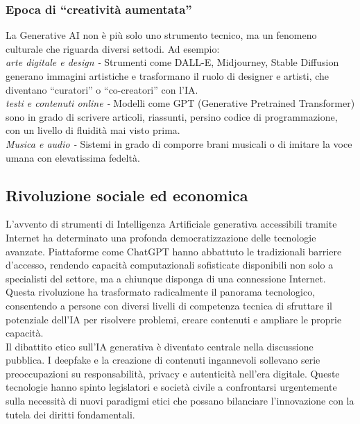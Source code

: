 \documentclass[14pt]{extbook}
\begin{document}
\subsubsection{Epoca di “creatività aumentata”}
La Generative AI non è più solo uno strumento tecnico, ma un fenomeno culturale che riguarda diversi settodi. Ad esempio:\\

\textit{arte digitale e design -} Strumenti come DALL-E, Midjourney, Stable Diffusion generano immagini artistiche e trasformano il ruolo di designer e artisti, che diventano “curatori” o “co-creatori” con l’IA.\\

\textit{testi e contenuti online -} Modelli come GPT (Generative Pretrained Transformer) sono in grado di scrivere articoli, riassunti, persino codice di programmazione, con un livello di fluidità mai visto prima.\\

\textit{Musica e audio -} Sistemi in grado di comporre brani musicali o di imitare la voce umana con elevatissima fedeltà.\\

\subsection{Rivoluzione sociale ed economica}
L'avvento di strumenti di Intelligenza Artificiale generativa accessibili tramite Internet ha determinato una profonda democratizzazione delle tecnologie avanzate. Piattaforme come ChatGPT hanno abbattuto le tradizionali barriere d'accesso, rendendo capacità computazionali sofisticate disponibili non solo a specialisti del settore, ma a chiunque disponga di una connessione Internet. Questa rivoluzione ha trasformato radicalmente il panorama tecnologico, consentendo a persone con diversi livelli di competenza tecnica di sfruttare il potenziale dell'IA per risolvere problemi, creare contenuti e ampliare le proprie capacità.\\

Il dibattito etico sull'IA generativa è diventato centrale nella discussione pubblica. I deepfake e la creazione di contenuti ingannevoli sollevano serie preoccupazioni su responsabilità, privacy e autenticità nell'era digitale. Queste tecnologie hanno spinto legislatori e società civile a confrontarsi urgentemente sulla necessità di nuovi paradigmi etici che possano bilanciare l'innovazione con la tutela dei diritti fondamentali.\\
\end{document}
